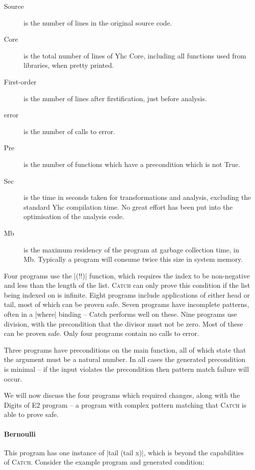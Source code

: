 \documentclass[preprint]{sigplanconf}
\newcommand{\C}[1]{\textsf{#1}}
\newcommand{\catch}{\textsc{Catch}}
\begin{document}
\begin{description}
\item[Source] is the number of lines in the original source code.
\item[Core] is the total number of lines of Yhc Core, including all functions used from libraries, when pretty printed.
\item[First-order] is the number of lines after firstification, just before analysis.
\item[\C{error}] is the number of calls to error.
\item[Pre] is the number of functions which have a precondition which is not True.
\item[Sec] is the time in seconds taken for transformations and analysis, excluding the standard Yhc compilation time. No great effort has been put into the optimisation of the analysis code.
\item[Mb] is the maximum residency of the program at garbage collection time, in Mb. Typically a program will consume twice this size in system memory.
\end{description}

Four programs use the |(!!)| function, which requires the index to be non-negative and less than the length of the list. \catch{} can only prove this condition if the list being indexed on is infinite. Eight programs include applications of either \C{head} or \C{tail}, most of which can be proven safe. Seven programs have incomplete patterns, often in a |where| binding -- Catch performs well on these. Nine programs use division, with the precondition that the divisor must not be zero. Most of these can be proven safe. Only four programs contain no calls to \C{error}.

Three programs have preconditions on the \C{main} function, all of which state that the argument must be a natural number. In all cases the generated precondition is minimal -- if the input violates the precondition then pattern match failure will occur.

We will now discuss the four programs which required changes, along with the Digits of E2 program -- a program with complex pattern matching that \catch{} is able to prove safe.

\paragraph{Bernoulli}

This program has one instance of |tail (tail x)|, which is beyond the capabilities of \catch{}. Consider the example program and generated condition:
\end{document}
